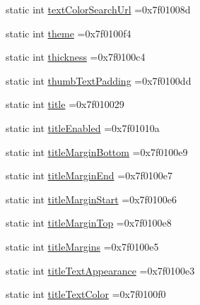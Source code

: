 \begin{DoxyCompactItemize}
\item 
static int \hyperlink{classandroid_1_1support_1_1graphics_1_1drawable_1_1animated_1_1R_1_1attr_a61fa39796e71b6cf61f4665329809b1b}{text\+Color\+Search\+Url} =0x7f01008d
\item 
static int \hyperlink{classandroid_1_1support_1_1graphics_1_1drawable_1_1animated_1_1R_1_1attr_a943b9a7d2bd193e11856412acfff905a}{theme} =0x7f0100f4
\item 
static int \hyperlink{classandroid_1_1support_1_1graphics_1_1drawable_1_1animated_1_1R_1_1attr_af049de530874dfe80a4b1d41fd6d34ce}{thickness} =0x7f0100c4
\item 
static int \hyperlink{classandroid_1_1support_1_1graphics_1_1drawable_1_1animated_1_1R_1_1attr_a0bce67ac2b5dbccef8d521c8a0bfab47}{thumb\+Text\+Padding} =0x7f0100dd
\item 
static int \hyperlink{classandroid_1_1support_1_1graphics_1_1drawable_1_1animated_1_1R_1_1attr_a29aa9767ec9815e26b0bf9db8366862e}{title} =0x7f010029
\item 
static int \hyperlink{classandroid_1_1support_1_1graphics_1_1drawable_1_1animated_1_1R_1_1attr_a2c2212684f78c5d0cf825f79078140c1}{title\+Enabled} =0x7f01010a
\item 
static int \hyperlink{classandroid_1_1support_1_1graphics_1_1drawable_1_1animated_1_1R_1_1attr_aa053744d6f8cb58352cc3ef5342a13a1}{title\+Margin\+Bottom} =0x7f0100e9
\item 
static int \hyperlink{classandroid_1_1support_1_1graphics_1_1drawable_1_1animated_1_1R_1_1attr_ad9b548547dd2cb0ea512931e325084be}{title\+Margin\+End} =0x7f0100e7
\item 
static int \hyperlink{classandroid_1_1support_1_1graphics_1_1drawable_1_1animated_1_1R_1_1attr_a53e6cd396ad9e82f541969eb10792c38}{title\+Margin\+Start} =0x7f0100e6
\item 
static int \hyperlink{classandroid_1_1support_1_1graphics_1_1drawable_1_1animated_1_1R_1_1attr_a67a7779546f0beca006f340866643b21}{title\+Margin\+Top} =0x7f0100e8
\item 
static int \hyperlink{classandroid_1_1support_1_1graphics_1_1drawable_1_1animated_1_1R_1_1attr_a5de1a440af6f3cca3c605ffe3601581a}{title\+Margins} =0x7f0100e5
\item 
static int \hyperlink{classandroid_1_1support_1_1graphics_1_1drawable_1_1animated_1_1R_1_1attr_affbc359c7261a14161a3ea046ad2a34b}{title\+Text\+Appearance} =0x7f0100e3
\item 
static int \hyperlink{classandroid_1_1support_1_1graphics_1_1drawable_1_1animated_1_1R_1_1attr_a692876807dcec1e186ee2257c8d89b85}{title\+Text\+Color} =0x7f0100f0

\end{DoxyCompactItemize}
